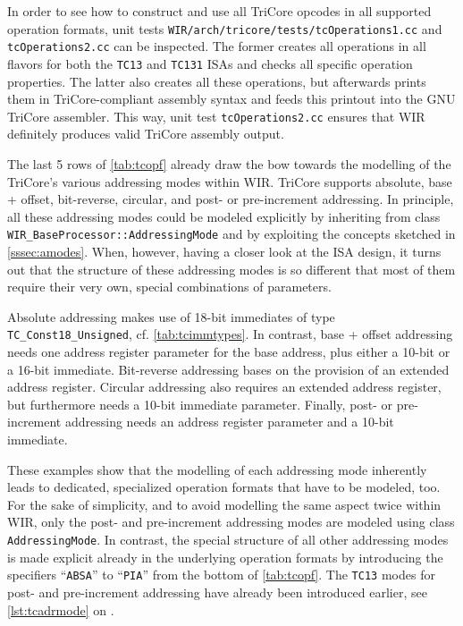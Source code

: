 In order to see how to construct and use all TriCore opcodes in all supported operation formats, unit tests \texttt{WIR/arch/tricore/tests/tcOperations1.cc} and \texttt{tcOperations2.cc} can be inspected.
The former creates all operations in all flavors for both the \texttt{TC13} and \texttt{TC131} \glspl{ISA} and checks all specific operation properties.
The latter also creates all these operations, but afterwards prints them in TriCore-compliant assembly syntax and feeds this printout into the GNU TriCore assembler.
This way, unit test \texttt{tcOperations2.cc} ensures that \gls{WIR} definitely produces valid TriCore assembly output.

The last 5 rows of \cref{tab:tcopf} already draw the bow towards the modelling of the TriCore's various addressing modes within \gls{WIR}.
TriCore supports absolute, base + offset, bit-reverse, circular, and post- or pre-increment addressing.
In principle, all these addressing modes could be modeled explicitly by inheriting from class \texttt{WIR\_Base\-Processor::AddressingMode} and by exploiting the concepts sketched in \cref{sssec:amodes}.
When, however, having a closer look at the \gls{ISA} design, it turns out that the structure of these addressing modes is so different that most of them require their very own, special combinations of parameters.

\begin{wirExample}
Absolute addressing makes use of 18-bit immediates of type \texttt{TC\_Const18\_Unsigned}, cf. \cref{tab:tcimmtypes}.
In contrast, base + offset addressing needs one address register parameter for the base address, plus either a 10-bit or a 16-bit immediate.
Bit-reverse addressing bases on the provision of an extended address register.
Circular addressing also requires an extended address register, but furthermore needs a 10-bit immediate parameter.
Finally, post- or pre-increment addressing needs an address register parameter and a 10-bit immediate.
\end{wirExample}

These examples show that the modelling of each addressing mode inherently leads to dedicated, specialized operation formats that have to be modeled, too.
For the sake of simplicity, and to avoid modelling the same aspect twice within \gls{WIR}, only the post- and pre-increment addressing modes are modeled using class \texttt{AddressingMode}.
In contrast, the special structure of all other addressing modes is made explicit already in the underlying operation formats by introducing the specifiers ``\texttt{ABSA}'' to ``\texttt{PIA}'' from the bottom of \cref{tab:tcopf}.
The \texttt{TC13} modes for post- and pre-increment addressing have already been introduced earlier, see \cref{lst:tcadrmode} on .


